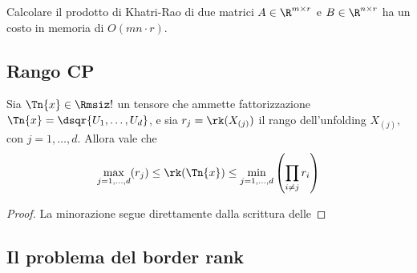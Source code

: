 \begin{remark}
  Calcolare il prodotto di Khatri-Rao di due matrici $ A \in \R^{m \times r} $ e $ B \in \R^{n \times
  r} $ ha un costo in memoria di $ O(mn
  \cdot r) $.
\end{remark}


\subsection{Rango CP}

\begin{proposition}
  Sia $ \Tn{x} \in \Rmsiz! $ un tensore che ammette fattorizzazione $ \Tn{x} = \dsqr{U_1, \ldots,
  U_d} $, e sia $ r_j = \rk(X_{(j)}) $ il rango dell'unfolding $ X_{(j)}, $ con $ j = 1, \ldots, d $. Allora vale che
  \begin{equation}
    \max_{j=1, \ldots, d}(r_j) \le \rk(\Tn{x}) \le \min_{j=1, \ldots, d}\left( \prod_{i \neq j}r_i \right)
  \end{equation}
\end{proposition}
\begin{proof}
  La minorazione segue direttamente dalla scrittura delle
  
\end{proof}

\subsection{Il problema del border rank}

